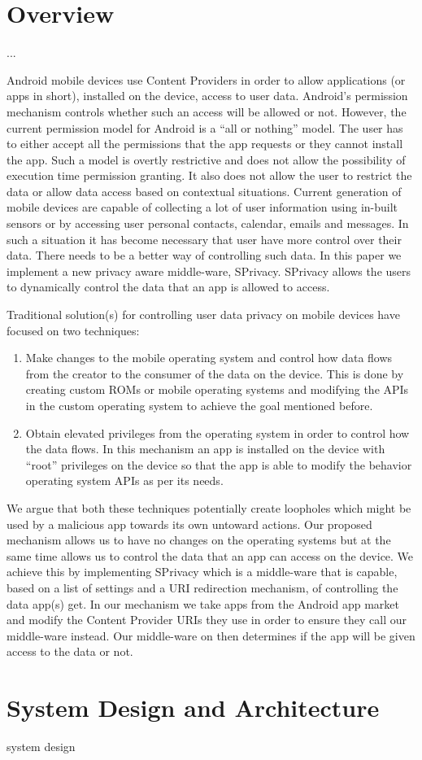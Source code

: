 \section{Overview}
...

Android mobile devices use Content Providers in order to allow applications (or apps in short), installed on the device, access to user data. Android's permission mechanism controls whether such an access will be allowed or not. However, the current permission model for Android is a ``all or nothing'' model. The user has to either accept all the permissions that the app requests or they cannot install the app. Such a model is overtly restrictive and does not allow the possibility of execution time permission granting. It also does not allow the user to restrict the data or allow data access based on contextual situations. Current generation of mobile devices are capable of collecting a lot of user information using in-built sensors or by accessing user personal contacts, calendar, emails and messages. In such a situation it has become necessary that user have more control over their data. There needs to be a better way of controlling such data. In this paper we implement a new privacy aware middle-ware, SPrivacy. SPrivacy allows the users to dynamically control the data that an app is allowed to access. 

Traditional solution(s) for controlling user data privacy on mobile devices have focused on two techniques:
\begin{enumerate}
	\item Make changes to the mobile operating system and control how data flows from the creator to the consumer of the data on the device. This is done by creating custom ROMs or mobile operating systems and modifying the APIs in the custom operating system to achieve the goal mentioned before.
	\item Obtain elevated privileges from the operating system in order to control how the data flows. In this mechanism an app is installed on the device with ``root'' privileges on the device so that the app is able to modify the behavior operating system APIs as per its needs.
\end{enumerate}

We argue that both these techniques potentially create loopholes which might be used by a malicious app towards its own untoward actions. Our proposed mechanism allows us to have no changes on the operating systems but at the same time allows us to control the data that an app can access on the device. We achieve this by implementing SPrivacy which is a middle-ware that is capable, based on a list of settings and a URI redirection mechanism, of controlling the data app(s) get. In our mechanism we take apps from the Android app market and modify the Content Provider URIs they use in order to ensure they call our middle-ware instead. Our middle-ware on then determines if the app will be given access to the data or not.

\section{System Design and Architecture}

system design